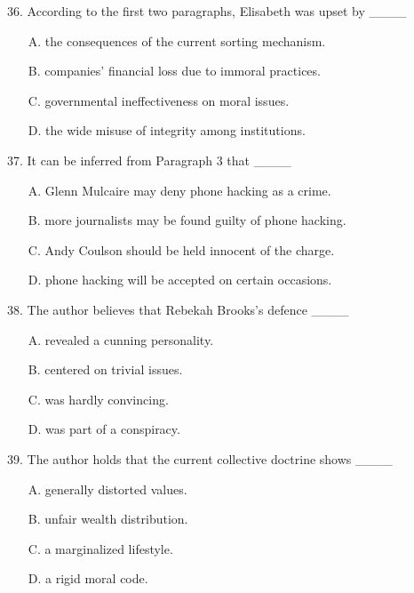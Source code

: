 \documentclass[UTF8,11pt]{ctexart}
\begin{document}
36. According to the first two paragraphs, Elisabeth was upset by \_\_\_\_


\begin{itemize}[leftmargin=2em,itemsep=.2em,topsep=.4em]\item[A.] the consequences of the current sorting mechanism.
\item[B.] companies’ financial loss due to immoral practices.
\item[C.] governmental ineffectiveness on moral issues.
\item[D.] the wide misuse of integrity among institutions.
\end{itemize}

37. It can be inferred from Paragraph 3 that \_\_\_\_


\begin{itemize}[leftmargin=2em,itemsep=.2em,topsep=.4em]\item[A.] Glenn Mulcaire may deny phone hacking as a crime.
\item[B.] more journalists may be found guilty of phone hacking.
\item[C.] Andy Coulson should be held innocent of the charge.
\item[D.] phone hacking will be accepted on certain occasions.
\end{itemize}

38. The author believes that Rebekah Brooks’s defence \_\_\_\_


\begin{itemize}[leftmargin=2em,itemsep=.2em,topsep=.4em]\item[A.] revealed a cunning personality.
\item[B.] centered on trivial issues.
\item[C.] was hardly convincing.
\item[D.] was part of a conspiracy.
\end{itemize}

39. The author holds that the current collective doctrine shows \_\_\_\_


\begin{itemize}[leftmargin=2em,itemsep=.2em,topsep=.4em]\item[A.] generally distorted values.
\item[B.] unfair wealth distribution.
\item[C.] a marginalized lifestyle.
\item[D.] a rigid moral code.
\end{itemize}
\end{document}
